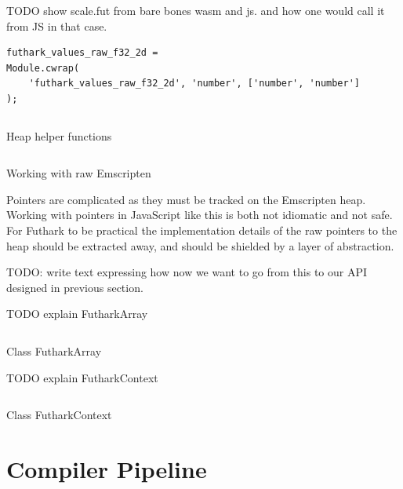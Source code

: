 \documentclass[11pt]{book}
\begin{document}
TODO show scale.fut from bare bones wasm and js. and how one would call it from JS in that case.

\begin{verbatim}
futhark_values_raw_f32_2d =
Module.cwrap(
    'futhark_values_raw_f32_2d', 'number', ['number', 'number']
);
\end{verbatim}
\begin{listing}[H] 
        \inputminted[fontsize=\small,baselinestretch=0.5,linenos]{JavaScript}{code/compiler/api_examples/heap-helpers.js}
        \caption{Heap helper functions}
        \label{lst:heap-helpers}    
\end{listing} 


\begin{listing}[H] 
        \inputminted[fontsize=\small,baselinestretch=0.5,linenos]{JavaScript}{code/compiler/api_examples/raw.js}
        \caption{Working with raw Emscripten }
        \label{lst:raw}    
\end{listing} 

Pointers are complicated as they must be tracked on the Emscripten heap. Working with pointers in JavaScript like this is both not idiomatic and not safe. For Futhark to be practical the implementation details of the raw pointers to the heap should be extracted away, and should be shielded by a layer of abstraction.

TODO: write text expressing how now we want to go from this to our API designed in previous section. 

TODO explain FutharkArray

\begin{listing}[H] 
        \inputminted[fontsize=\small,baselinestretch=0.5,linenos]{JavaScript}{code/compiler/api_examples/FutharkArray.js}
        \caption{Class FutharkArray}
        \label{lst:FutharkArray}    
\end{listing} 

TODO explain FutharkContext

\begin{listing}[H] 
        \inputminted[fontsize=\small,baselinestretch=0.5,linenos]{JavaScript}{code/compiler/api_examples/FutharkContext.js}
        \caption{Class FutharkContext}
        \label{lst:FutharkContext}    
\end{listing} 


\section{Compiler Pipeline}
\end{document}
